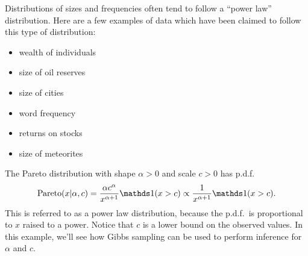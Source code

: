 \documentclass[12pt]{article}
\begin{document}
Distributions of sizes and frequencies often tend to follow a ``power law'' distribution. Here are a few examples of data which have been claimed to follow this type of distribution:
\begin{itemize}
    \item wealth of individuals
    \item size of oil reserves
    \item size of cities
    \item word frequency
    \item returns on stocks
    \item size of meteorites
\end{itemize}
The Pareto distribution with shape $\alpha>0$ and scale $c >0$ has p.d.f.\
$$ \Pareto(x|\alpha,c) = \frac{\alpha c^\alpha}{x^{\alpha+1}}\I(x>c)\propto \frac{1}{x^{\alpha+1}}\I(x>c).$$
This is referred to as a power law distribution, because the p.d.f.\ is proportional to $x$ raised to a power.
Notice that $c$ is a lower bound on the observed values.
In this example, we'll see how Gibbs sampling can be used to perform inference for $\alpha$ and $c$. 
\end{document}

